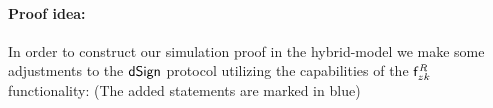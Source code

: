 \paragraph{Proof idea:} In order to construct our simulation proof in the hybrid-model we make some adjustments to the $\mathsf{dSign}$ protocol utilizing the capabilities of the $\mathsf{f}^{\mathit{R}}_{zk}$ functionality: (The added statements are marked in blue)
\begin{center}
\end{center}
